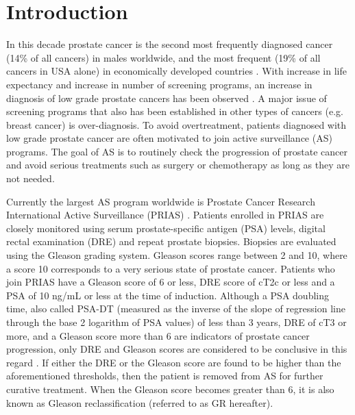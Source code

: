
\section{Introduction}
\label{sec : introduction}
In this decade prostate cancer is the second most frequently diagnosed cancer (14\% of all cancers) in males worldwide, and the most frequent (19\% of all cancers in USA alone) in economically developed countries \citep{GlobalCancerStats2012,USACancerStats2017}. With increase in life expectancy and increase in number of screening programs, an increase in diagnosis of low grade prostate cancers has been observed \citep{potoskyPSAcancer}. A major issue of screening programs that also has been established in other types of cancers (e.g. breast cancer) is over-diagnosis. To avoid overtreatment, patients diagnosed with low grade prostate cancer are often motivated to join active surveillance (AS) programs. The goal of AS is to routinely check the progression of prostate cancer and avoid serious treatments such as surgery or chemotherapy as long as they are not needed.

Currently the largest AS program worldwide is Prostate Cancer Research International Active Surveillance (PRIAS) \citep{bokhorst2015compliance}. Patients enrolled in PRIAS are closely monitored using serum prostate-specific antigen (PSA) levels, digital rectal examination (DRE) and repeat prostate biopsies. Biopsies are evaluated using the Gleason grading system. Gleason scores range between 2 and 10, where a score 10 corresponds to a very serious state of prostate cancer. Patients who join PRIAS have a Gleason score of 6 or less, DRE score of cT2c or less and a PSA of 10 ng/mL or less at the time of induction. Although a PSA doubling time, also called PSA-DT (measured as the inverse of the slope of regression line through the base 2 logarithm of PSA values) of less than 3 years, DRE of cT3 or more, and a Gleason score more than 6 are indicators of prostate cancer progression, only DRE and Gleason scores are considered to be conclusive in this regard \citep{bokhorst2016decade}. If either the DRE or the Gleason score are found to be higher than the aforementioned thresholds, then the patient is removed from AS for further curative treatment. When the Gleason score becomes greater than 6, it is also known as Gleason reclassification (referred to as GR hereafter).

